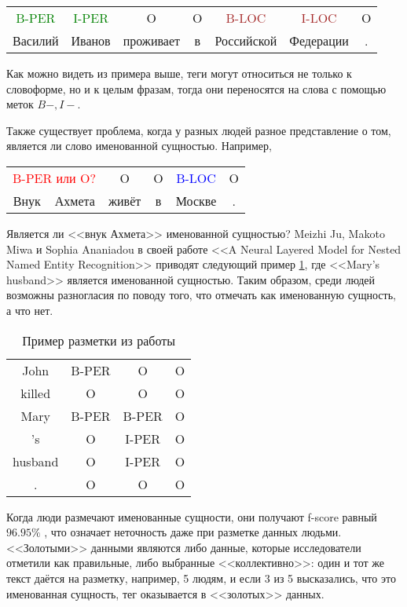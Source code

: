 \begin{tabular}[h]{ccccccc}
\textcolor{green}{B-PER} & \textcolor{green}{I-PER} & O & O & \textcolor{brown}{B-LOC} &  \textcolor{brown}{I-LOC} & O \\
Василий & Иванов & проживает & в & Российской & Федерации & . \\
\end{tabular}

Как можно видеть из примера выше, теги могут относиться не только к словоформе, но и к целым фразам, тогда они переносятся на слова с помощью меток $B-, I-$. 

Также существует проблема, когда у разных людей разное представление о том, является ли слово именованной сущностью. Например,

\begin{tabular}[h]{cccccc}
\multicolumn{2}{c}{\textcolor{red}{B-PER или O?}} & O & O & \textcolor{blue}{B-LOC} & O \\
Внук & Ахмета & живёт & в & Москве & . \\
\end{tabular}

Является ли <<внук Ахмета>> именованной сущностью? Meizhi Ju, Makoto Miwa и Sophia Ananiadou в своей работе <<A Neural Layered Model for Nested Named Entity Recognition>> \cite{ju-etal-2018-neural} приводят следующий пример \ref{table:example_nested}, где <<Mary's husband>> является именованной сущностью. Таким образом, среди людей возможны разногласия по поводу того, что отмечать как именованную сущность, а что нет.

\begin{table}[h]
\begin{tabular}[h]{cccc}
John  &  B-PER  & O  & O \\
killed & O  & O  & O \\ 
Mary  &  B-PER &  B-PER &  O \\
's  & O &  I-PER &  O \\
husband & O &  I-PER &  O \\
.  & O &  O &  O 
\end{tabular}
\caption{Пример разметки из работы \cite{ju-etal-2018-neural} }
\label{table:example_nested}
\end{table}

Когда люди размечают именованные сущности, они получают f-score равный $96.95\%$ \cite{marsh-perzanowski-1998-muc}, что означает неточность даже при разметке данных людьми. <<Золотыми>> данными являются либо данные, которые исследователи отметили как правильные, либо выбранные <<коллективно>>: один и тот же текст даётся на разметку, например, 5 людям, и если 3 из 5 высказались, что это именованная сущность, тег оказывается в <<золотых>> данных.


